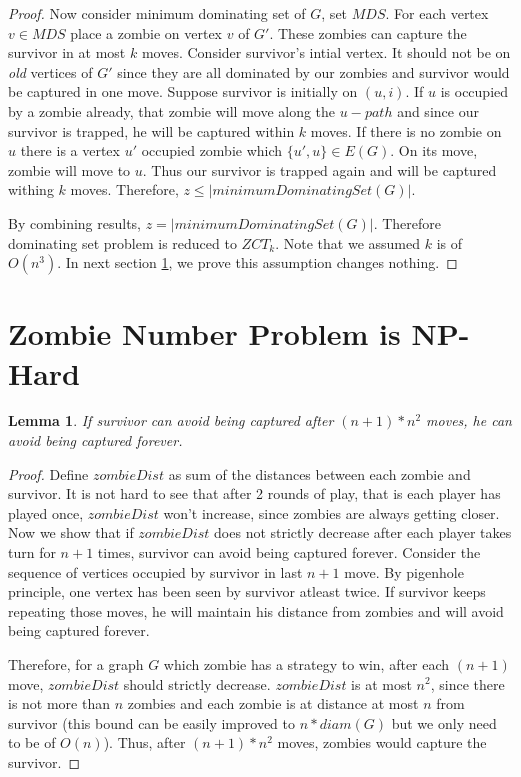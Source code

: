 \documentclass[1p]{elsarticle}
\newtheorem{lemma}[theorem]{Lemma}
\begin{document}
\begin{proof}
		Now consider minimum dominating set of $G$, set $MDS$. For each vertex $v \in MDS$ place a zombie on vertex $v$
		of $G'$. These zombies can capture the survivor in at most $k$ moves. Consider survivor's intial vertex. It
		should not be on {\it old} vertices of $G'$ since they are all dominated by our zombies and survivor would be
		captured in one move. Suppose survivor is initially on $(u,i)$. If $u$ is occupied by a zombie already, that
		zombie will move along the $u-path$ and since our survivor is trapped, he will be captured within $k$ moves. If
		there is no zombie on $u$ there is a vertex $u'$ occupied zombie which $ \{u',u\} \in E(G)$. On its move, zombie
		will move to $u$. Thus our survivor is trapped again and will be captured withing $k$ moves. Therefore, $z \leq
		|minimumDominatingSet(G)|$.

		By combining results, $z = |minimumDominatingSet(G)|$. Therefore dominating set problem is reduced to $ZCT_k$.
		Note that we assumed $k$ is of $O(n^3)$. In next section \ref{np-zombienumber}, we prove this assumption changes nothing.

	\end{proof}

\section{Zombie Number Problem is NP-Hard}\label{np-zombienumber}

	\begin{lemma}
		If survivor can avoid being captured after $(n + 1) * n^2$ moves, he can avoid being captured forever.
	\end{lemma}
	\begin{proof}
		Define $zombieDist$ as sum of the distances between each zombie and survivor. It is not hard to see that after 2
		rounds of play, that is each player has played once, $zombieDist$ won't increase, since zombies are always
		getting closer. Now we show that if $zombieDist$ does not strictly decrease after each player takes turn for $n
		+ 1$ times, survivor can avoid being captured forever. Consider the sequence of vertices occupied by survivor in
		last $n + 1$ move. By pigenhole principle, one vertex has been seen by survivor atleast twice. If survivor keeps
		repeating those moves, he will maintain his distance from zombies and will avoid being captured forever.

		Therefore, for a graph $G$ which zombie has a strategy to win, after each $(n + 1)$ move, $zombieDist$ should
		strictly decrease. $zombieDist$ is at most $n^2$, since there is not more than $n$ zombies and each zombie is at
		distance at most $n$ from survivor (this bound can be easily improved to $n * diam(G)$ but we only need to be of
		$O(n)$). Thus, after $(n + 1) * n^2$ moves, zombies would capture the survivor.
	\end{proof}
\end{document}
